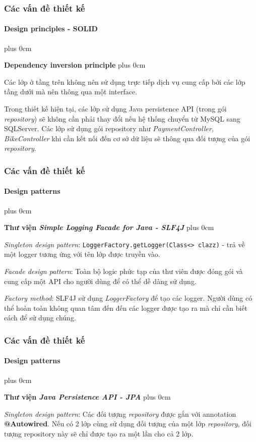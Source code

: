 \documentclass[11pt]{beamer}
\renewcommand{\raggedright}{\leftskip=0pt \rightskip=0pt plus 0cm}
\let\olditemize=\itemize
\renewenvironment{itemize}{\olditemize\raggedright}{\endlist}
\begin{document}
\begin{frame}[plain]
	\frametitle{Các vấn đề thiết kế}
	\framesubtitle{Design principles - SOLID}
	\begin{itemize}
		\item \textbf{Dependency inversion principle}
		\begin{itemize}
			\item Các lớp ở tầng trên không nên sử dụng trực tiếp dịch vụ cung cấp bởi các lớp tầng dưới mà nên thông qua một interface.\\[5pt]
			\item Trong thiết kế hiện tại, các lớp sử dụng Java persistence API (trong gói \textit{repository}) sẽ không cần phải thay đổi nếu hệ thống chuyển từ MySQL sang SQLServer. Các lớp sử dụng gói repository như \textit{PaymentController, BikeController} khi cần kết nối đến cơ sở dữ liệu sẽ thông qua đối tượng của gói \textit{repository}.\\[5pt]
		\end{itemize}
	\end{itemize}
\end{frame}
\begin{frame}[plain]
	\frametitle{Các vấn đề thiết kế}
	\framesubtitle{Design patterns}
	\begin{itemize}
		\item \textbf{Thư viện \textit{Simple Logging Facade for Java - SLF4J}}
		\begin{itemize}
			\item \textit{Singleton design pattern}: {\tt LoggerFactory.getLogger(Class<> clazz)} - trả về một logger tương ứng với tên lớp được truyền vào. \\[5pt]
			\item \textit{Facade design pattern}: Toàn bộ logic phức tạp của thư viên được đóng gói và cung cấp một API cho người dùng để có thể dễ dàng sử dụng. \\[5pt]
			\item \textit{Factory method}: SLF4J sử dụng \textit{LoggerFactory} để tạo các logger. Người dùng có thể hoàn toàn không quan tâm đến đến các logger được tạo ra mà chỉ cần biết cách để sử dụng chúng. 
		\end{itemize}
	\end{itemize}
\end{frame}
\begin{frame}[plain]
	\frametitle{Các vấn đề thiết kế}
	\framesubtitle{Design patterns}
	\begin{itemize}
		\item \textbf{Thư viện \textit{Java Persistence API - JPA}}
		\begin{itemize}
			\item \textit{Singleton design pattern}: Các đối tượng \textit{repository} được gắn với annotation \textbf{@Autowired}. Nếu có 2 lớp cùng sử dụng đối tượng của một lớp \textit{repository}, đối tượng repository này sẽ chỉ được tạo ra một lần cho cả 2 lớp. 
		\end{itemize}
	\end{itemize}
\end{frame}
\end{document}
